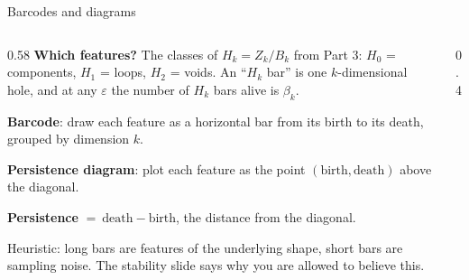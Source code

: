 \documentclass[10pt,aspectratio=169]{beamer}
\begin{document}
    \begin{frame}{Barcodes and diagrams}
        \begin{columns}[T,onlytextwidth]
            \begin{column}{0.58\textwidth}
                \small
                \textbf{Which features?} The classes of $H_k=Z_k/B_k$ from Part 3:
                $H_0$ = components, $H_1$ = loops, $H_2$ = voids. An ``$H_k$ bar'' is one
                $k$-dimensional hole, and at any $\varepsilon$ the number of $H_k$ bars
                alive is $\beta_k$.

                \vspace{0.5em}
                \textbf{Barcode}: draw each feature as a horizontal bar from its birth to its death,
                grouped by dimension $k$.

                \vspace{0.5em}
                \textbf{Persistence diagram}: plot each feature as the point
                $(\text{birth},\text{death})$ above the diagonal.

                \vspace{0.5em}
                \textbf{Persistence} $=\ \text{death}-\text{birth}$, the distance from the diagonal.

                \vspace{0.7em}
                \alert{Heuristic:} long bars are features of the underlying shape, short bars are
                sampling noise. The stability slide says why you are allowed to believe this.
            \end{column}
            \begin{column}{0.4\textwidth}
                \centering
            \end{column}
        \end{columns}
    \end{frame}
\end{document}
